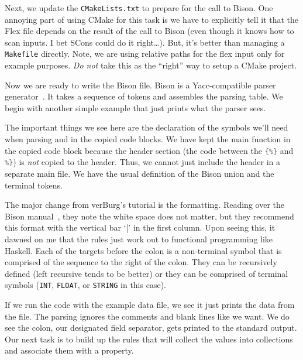\documentclass{article}
\begin{document}
Next, we update the \lstinline{CMakeLists.txt} to prepare for the call
to Bison.  One annoying part of using CMake for this task is we have to
explicitly tell it that the Flex file depends on the result of the call
to Bison (even though it knows how to scan inputs.  I bet SCons could do
it right…).  But, it's better than managing a \lstinline{Makefile}
directly.  Note, we are using relative paths for the flex input only for
example purposes.  \emph{Do not} take this as the ``right'' way to setup
a CMake project.

\begin{code block}
    
\end{code block}

Now we are ready to write the Bison file.  Bison is a Yacc-compatible
parser generator~\cite{gnu_bison_2019}.  It takes a sequence of tokens
and assembles the parsing table.  We begin with another simple example
that just prints what the parser sees.

\begin{code block}
    
\end{code block}

The important things we see here are the declaration of the symbols
we'll need when parsing and in the copied code blocks.  We have kept the
main function in the copied code block because the header section (the
code between the \lstinline[language=C]|{%}| and \lstinline[language=C]|%}|)
is \emph{not} copied to the header.  Thus, we cannot just include the
header in a separate main file.  We have the usual definition of the
Bison union and the terminal tokens.

The major change from verBurg's tutorial is the formatting.  Reading
over the Bison manual~\cite{gnu_bison_2019}, they note the white space
does not matter, but they recommend this format with the vertical bar
`|' in the first column.  Upon seeing this, it dawned on me that the
rules just work out to functional programming like Haskell.  Each of the
targets before the colon is a non-terminal symbol that is comprised of
the sequence to the right of the colon.  They can be recursively defined
(left recursive tends to be better) or they can be comprised of terminal
symbols (\lstinline{INT}, \lstinline{FLOAT}, or \lstinline{STRING} in
this case).

If we run the code with the example data file, we see it just prints the
data from the file.  The parsing ignores the comments and blank lines
like we want.  We do see the colon, our designated field separator, gets
printed to the standard output.  Our next task is to build up the rules
that will collect the values into collections and associate them with a
property.
\end{document}
